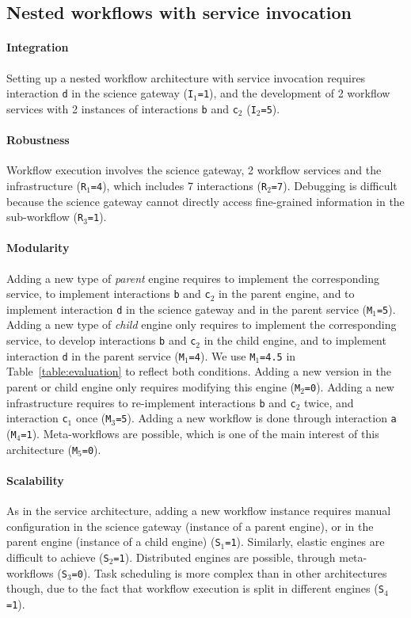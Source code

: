 \documentclass[preprint,3p,twocolumn]{elsarticle}
\begin{document}
\subsection{Nested workflows with service invocation}

\paragraph{Integration} Setting up a nested workflow architecture with
service invocation requires interaction \texttt{d} in the science
gateway (\texttt{I$_1$=1}), and the development of 2 workflow services
with 2 instances of interactions \texttt{b} and \texttt{c$_2$}
(\texttt{I$_2$=5}).

\paragraph{Robustness} Workflow execution involves the science
gateway, 2 workflow services and the infrastructure
(\texttt{R$_1$=4}), which includes 7 interactions
(\texttt{R$_2$=7}). Debugging is difficult because the science gateway
cannot directly access fine-grained information in the sub-workflow
(\texttt{R$_3$=1}).

\paragraph{Modularity} Adding a new type of \emph{parent} engine
requires to implement the corresponding service, to implement
interactions \texttt{b} and \texttt{c$_2$} in the parent engine, and
to implement interaction \texttt{d} in the science gateway and in the
parent service (\texttt{M$_1$=5}). Adding a new type of \emph{child}
engine only requires to implement the corresponding service, to
develop interactions \texttt{b} and \texttt{c$_2$} in the child
engine, and to implement interaction \texttt{d} in the parent service
(\texttt{M$_1$=4}). We use \texttt{M$_1$=4.5} in
Table~\ref{table:evaluation} to reflect both conditions. Adding a new
version in the parent or child engine only requires modifying this
engine (\texttt{M$_2$=0}). Adding a new infrastructure requires to
re-implement interactions \texttt{b} and \texttt{c$_2$} twice, and
interaction \texttt{c$_1$} once (\texttt{M$_3$=5}). Adding a new
workflow is done through interaction \texttt{a}
(\texttt{M$_4$=1}). Meta-workflows are possible, which is one of the
main interest of this architecture (\texttt{M$_5$=0}).

\paragraph{Scalability} As in the service architecture, adding a new
workflow instance requires manual configuration in the science gateway
(instance of a parent engine), or in the parent engine (instance of a
child engine) (\texttt{S$_1$=1}). Similarly, elastic engines are
difficult to achieve (\texttt{S$_2$=1}). Distributed engines are
possible, through meta-workflows (\texttt{S$_3$=0}). Task scheduling
is more complex than in other architectures though, due to the fact
that workflow execution is split in different engines (\texttt{S$_4$=1}).
\end{document}
